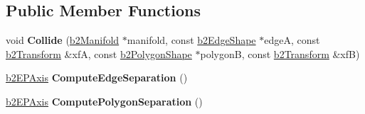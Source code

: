 \subsection*{Public Member Functions}
\begin{DoxyCompactItemize}
\item 
\mbox{\label{structb2EPCollider_a22f13698b4adde74b9bdb705f59f9778}} 
void {\bfseries Collide} (\hyperlink{structb2Manifold}{b2\+Manifold} $\ast$manifold, const \hyperlink{classb2EdgeShape}{b2\+Edge\+Shape} $\ast$edgeA, const \hyperlink{structb2Transform}{b2\+Transform} \&xfA, const \hyperlink{classb2PolygonShape}{b2\+Polygon\+Shape} $\ast$polygonB, const \hyperlink{structb2Transform}{b2\+Transform} \&xfB)
\item 
\mbox{\label{structb2EPCollider_a105a28c48afe6dc4158e6d5d303bf5e1}} 
\hyperlink{structb2EPAxis}{b2\+E\+P\+Axis} {\bfseries Compute\+Edge\+Separation} ()
\item 
\mbox{\label{structb2EPCollider_a46c340d43b25b776db8356c5b0249002}} 
\hyperlink{structb2EPAxis}{b2\+E\+P\+Axis} {\bfseries Compute\+Polygon\+Separation} ()
\end{DoxyCompactItemize}
